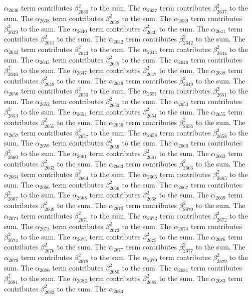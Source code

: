 \begin{lemma}
$\alpha_{2636}$ term contributes $\beta_{2636}^{2}$ to the sum. The $\alpha_{2637}$ term contributes $\beta_{2637}^{2}$ to the sum. The $\alpha_{2638}$ term contributes $\beta_{2638}^{2}$ to the sum. The $\alpha_{2639}$ term contributes $\beta_{2639}^{2}$ to the sum. The $\alpha_{2640}$ term contributes $\beta_{2640}^{2}$ to the sum. The $\alpha_{2641}$ term contributes $\beta_{2641}^{2}$ to the sum. The $\alpha_{2642}$ term contributes $\beta_{2642}^{2}$ to the sum. The $\alpha_{2643}$ term contributes $\beta_{2643}^{2}$ to the sum. The $\alpha_{2644}$ term contributes $\beta_{2644}^{2}$ to the sum. The $\alpha_{2645}$ term contributes $\beta_{2645}^{2}$ to the sum. The $\alpha_{2646}$ term contributes $\beta_{2646}^{2}$ to the sum. The $\alpha_{2647}$ term contributes $\beta_{2647}^{2}$ to the sum. The $\alpha_{2648}$ term contributes $\beta_{2648}^{2}$ to the sum. The $\alpha_{2649}$ term contributes $\beta_{2649}^{2}$ to the sum. The $\alpha_{2650}$ term contributes $\beta_{2650}^{2}$ to the sum. The $\alpha_{2651}$ term contributes $\beta_{2651}^{2}$ to the sum. The $\alpha_{2652}$ term contributes $\beta_{2652}^{2}$ to the sum. The $\alpha_{2653}$ term contributes $\beta_{2653}^{2}$ to the sum. The $\alpha_{2654}$ term contributes $\beta_{2654}^{2}$ to the sum. The $\alpha_{2655}$ term contributes $\beta_{2655}^{2}$ to the sum. The $\alpha_{2656}$ term contributes $\beta_{2656}^{2}$ to the sum. The $\alpha_{2657}$ term contributes $\beta_{2657}^{2}$ to the sum. The $\alpha_{2658}$ term contributes $\beta_{2658}^{2}$ to the sum. The $\alpha_{2659}$ term contributes $\beta_{2659}^{2}$ to the sum. The $\alpha_{2660}$ term contributes $\beta_{2660}^{2}$ to the sum. The $\alpha_{2661}$ term contributes $\beta_{2661}^{2}$ to the sum. The $\alpha_{2662}$ term contributes $\beta_{2662}^{2}$ to the sum. The $\alpha_{2663}$ term contributes $\beta_{2663}^{2}$ to the sum. The $\alpha_{2664}$ term contributes $\beta_{2664}^{2}$ to the sum. The $\alpha_{2665}$ term contributes $\beta_{2665}^{2}$ to the sum. The $\alpha_{2666}$ term contributes $\beta_{2666}^{2}$ to the sum. The $\alpha_{2667}$ term contributes $\beta_{2667}^{2}$ to the sum. The $\alpha_{2668}$ term contributes $\beta_{2668}^{2}$ to the sum. The $\alpha_{2669}$ term contributes $\beta_{2669}^{2}$ to the sum. The $\alpha_{2670}$ term contributes $\beta_{2670}^{2}$ to the sum. The $\alpha_{2671}$ term contributes $\beta_{2671}^{2}$ to the sum. The $\alpha_{2672}$ term contributes $\beta_{2672}^{2}$ to the sum. The $\alpha_{2673}$ term contributes $\beta_{2673}^{2}$ to the sum. The $\alpha_{2674}$ term contributes $\beta_{2674}^{2}$ to the sum. The $\alpha_{2675}$ term contributes $\beta_{2675}^{2}$ to the sum. The $\alpha_{2676}$ term contributes $\beta_{2676}^{2}$ to the sum. The $\alpha_{2677}$ term contributes $\beta_{2677}^{2}$ to the sum. The $\alpha_{2678}$ term contributes $\beta_{2678}^{2}$ to the sum. The $\alpha_{2679}$ term contributes $\beta_{2679}^{2}$ to the sum. The $\alpha_{2680}$ term contributes $\beta_{2680}^{2}$ to the sum. The $\alpha_{2681}$ term contributes $\beta_{2681}^{2}$ to the sum. The $\alpha_{2682}$ term contributes $\beta_{2682}^{2}$ to the sum. The $\alpha_{2683}$ term contributes $\beta_{2683}^{2}$ to the sum. The $\alpha_{2684}$ 
\end{lemma}
